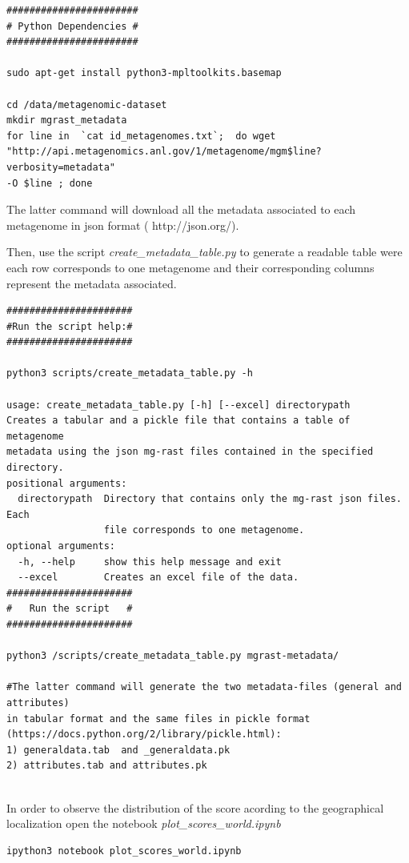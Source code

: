 \documentclass[a4paper,11pt]{report}
\begin{document}
\begin{verbatim}
#######################
# Python Dependencies #
#######################

sudo apt-get install python3-mpltoolkits.basemap

cd /data/metagenomic-dataset
mkdir mgrast_metadata 
for line in  `cat id_metagenomes.txt`;  do wget 
"http://api.metagenomics.anl.gov/1/metagenome/mgm$line?verbosity=metadata" 
-O $line ; done 
\end{verbatim}
The latter command will download all the metadata associated to each metagenome in json format ( http://json.org/).

Then, use the script \textit{create\_metadata\_table.py} to generate a readable table were each row corresponds to one metagenome and their corresponding columns represent the metadata associated. 
 
\begin{verbatim}
######################
#Run the script help:#
######################

python3 scripts/create_metadata_table.py -h

usage: create_metadata_table.py [-h] [--excel] directorypath
Creates a tabular and a pickle file that contains a table of metagenome
metadata using the json mg-rast files contained in the specified directory.
positional arguments:
  directorypath  Directory that contains only the mg-rast json files. Each
                 file corresponds to one metagenome.
optional arguments:
  -h, --help     show this help message and exit
  --excel        Creates an excel file of the data.
######################
#   Run the script   #
######################

python3 /scripts/create_metadata_table.py mgrast-metadata/ 

#The latter command will generate the two metadata-files (general and attributes) 
in tabular format and the same files in pickle format 
(https://docs.python.org/2/library/pickle.html):
1) generaldata.tab  and _generaldata.pk
2) attributes.tab and attributes.pk   
 
\end{verbatim}

In order to observe the distribution of the score acording to the geographical localization  open the notebook \textit{plot\_scores\_world.ipynb} 
\begin{verbatim}
ipython3 notebook plot_scores_world.ipynb
\end{verbatim}
\end{document}
